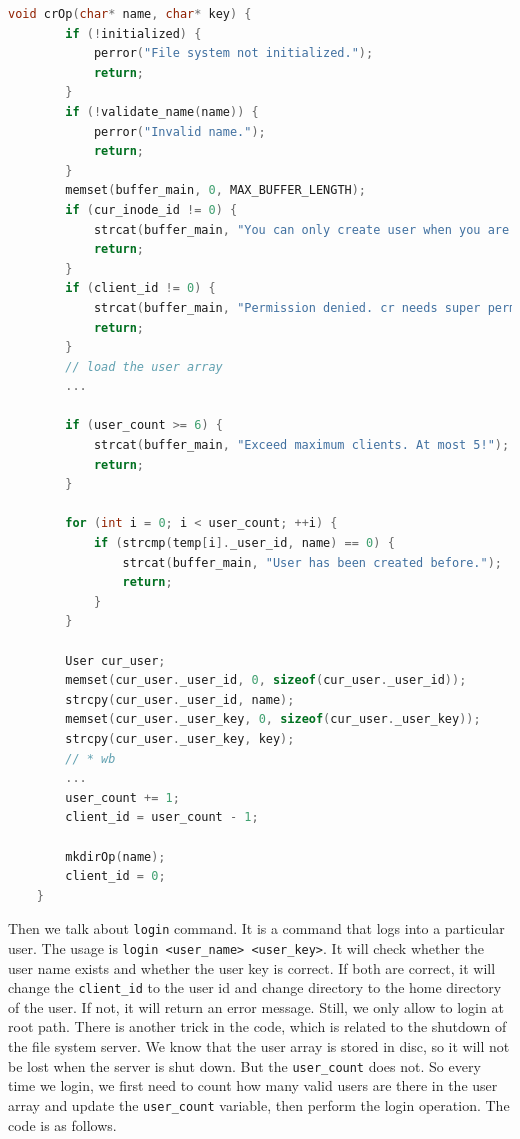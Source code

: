 \begin{lstlisting}[language=C]
    void crOp(char* name, char* key) {
        if (!initialized) {
            perror("File system not initialized.");
            return;
        }
        if (!validate_name(name)) {
            perror("Invalid name.");
            return;
        }
        memset(buffer_main, 0, MAX_BUFFER_LENGTH);
        if (cur_inode_id != 0) {
            strcat(buffer_main, "You can only create user when you are in / path");
            return;
        } 
        if (client_id != 0) {
            strcat(buffer_main, "Permission denied. cr needs super permission.");
            return;
        }
        // load the user array
        ... 
    
        if (user_count >= 6) {
            strcat(buffer_main, "Exceed maximum clients. At most 5!");
            return;
        }
    
        for (int i = 0; i < user_count; ++i) {
            if (strcmp(temp[i]._user_id, name) == 0) {
                strcat(buffer_main, "User has been created before.");
                return;
            }
        }
        
        User cur_user;
        memset(cur_user._user_id, 0, sizeof(cur_user._user_id));
        strcpy(cur_user._user_id, name);
        memset(cur_user._user_key, 0, sizeof(cur_user._user_key));
        strcpy(cur_user._user_key, key);
        // * wb
        ... 
        user_count += 1;
        client_id = user_count - 1; 

        mkdirOp(name);
        client_id = 0;
    }    
\end{lstlisting}

Then we talk about \texttt{login} command. It is a command that logs into a particular user. The usage is \texttt{login <user\_name> <user\_key>}. 
It will check whether the user name exists and whether the user key is correct. If both are correct, it will change the \texttt{client\_id} to the user id and change directory to the home directory of the user.
If not, it will return an error message. Still, we only allow to login at root path. There is another trick in the code, which is related to the shutdown of the file system server.
We know that the user array is stored in disc, so it will not be lost when the server is shut down. But the \texttt{user\_count} does not. So every time we login, we first need to count how many valid users are there in the user array and update the \texttt{user\_count} variable, then 
perform the login operation. The code is as follows.

